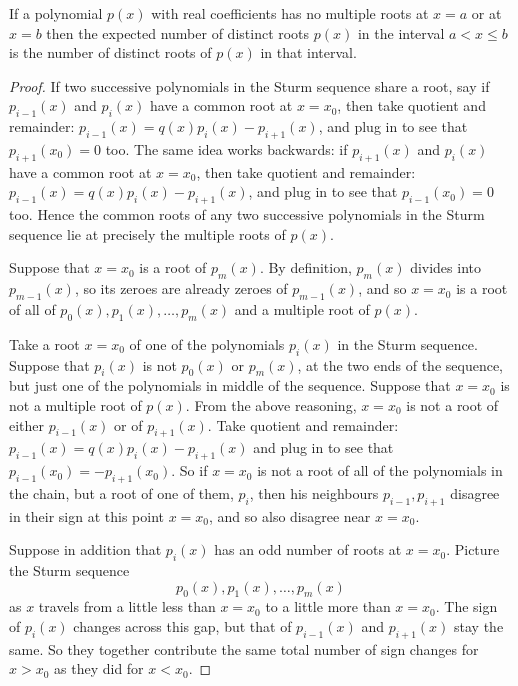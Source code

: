 \begin{theorem}[Sturm]
If a polynomial \(p(x)\) with real coefficients has no multiple roots at \(x=a\) or at \(x=b\) then the expected number of distinct roots \(p(x)\) in the interval \(a < x \le b\) is the number of distinct roots of \(p(x)\) in that interval.
\end{theorem}
\begin{proof}
If two successive polynomials in the Sturm sequence share a root, say if \(p_{i-1}(x)\) and \(p_i(x)\) have a common root at \(x=x_0\), then take quotient and remainder:
\(p_{i-1}(x) = q(x) p_i(x) - p_{i+1}(x)\), and plug in to see that \(p_{i+1}(x_0)=0\) too.
The same idea works backwards: if \(p_{i+1}(x)\) and \(p_i(x)\) have a common root at \(x=x_0\), then take quotient and remainder: \(p_{i-1}(x) = q(x) p_i(x) - p_{i+1}(x)\), and plug in to see that \(p_{i-1}(x_0)=0\) too.
Hence the common roots of any two successive polynomials in the Sturm sequence lie at precisely the multiple roots of \(p(x)\).

Suppose that \(x=x_0\) is a root of \(p_m(x)\).
By definition, \(p_m(x)\) divides into \(p_{m-1}(x)\), so its zeroes are already zeroes of \(p_{m-1}(x)\), and so \(x=x_0\) is a root of all of \(p_0(x), p_1(x), \dots, p_m(x)\) and a multiple root of \(p(x)\).

Take a root \(x=x_0\) of one of the polynomials \(p_i(x)\) in the Sturm sequence.
Suppose that \(p_i(x)\) is not \(p_0(x)\) or \(p_m(x)\), at the two ends of the sequence, but just one of the polynomials in middle of the sequence.
Suppose that \(x=x_0\) is not a multiple root of \(p(x)\).
From the above reasoning, \(x=x_0\) is not a root of either \(p_{i-1}(x)\) or of \(p_{i+1}(x)\).
Take quotient and remainder: \(p_{i-1}(x) = q(x) p_i(x) - p_{i+1}(x)\) and plug in to see that 
\(p_{i-1}(x_0)=-p_{i+1}(x_0)\).
So if \(x=x_0\) is not a root of all of the polynomials in the chain, but a root of one of them, \(p_i\), then his neighbours \(p_{i-1}, p_{i+1}\) disagree in their sign at this point \(x=x_0\), and so also disagree near \(x=x_0\).

Suppose in addition that \(p_i(x)\) has an odd number of roots at \(x=x_0\).
Picture the Sturm sequence
\[
p_0(x), p_1(x), \dots, p_m(x)
\]
as \(x\) travels from a little less than \(x=x_0\) to a little more than \(x=x_0\).
The sign of \(p_i(x)\) changes across this gap, but that of \(p_{i-1}(x)\) and \(p_{i+1}(x)\) stay the same.
So they together contribute the same total number of sign changes for \(x>x_0\) as they did for \(x<x_0\).


\end{proof}
